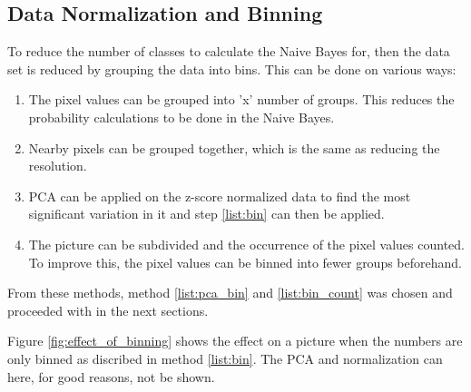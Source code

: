 \subsection{Data Normalization and Binning}

To reduce the number of classes to calculate the Naive Bayes for, then the data set is reduced by grouping the data into bins.
This can be done on various ways:

\begin{enumerate}
\item The pixel values can be grouped into 'x' number of groups.
This reduces the probability calculations to be done in the Naive Bayes. \label{list:bin}
\item Nearby pixels can be grouped together, which is the same as reducing the resolution.
\item PCA can be applied on the z-score normalized data to find the most significant variation in it and step \ref{list:bin} can then be applied. \label{list:pca_bin}
\item The picture can be subdivided and the occurrence of the pixel values counted. To improve this, the pixel values can be binned into fewer groups beforehand. \label{list:bin_count}
\end{enumerate}

From these methods, method \ref{list:pca_bin} and \ref{list:bin_count} was chosen and proceeded with in the next sections.

Figure \ref{fig:effect_of_binning} shows the effect on a picture when the numbers are only binned as discribed in method \ref{list:bin}.
The PCA and normalization can here, for good reasons, not be shown.


